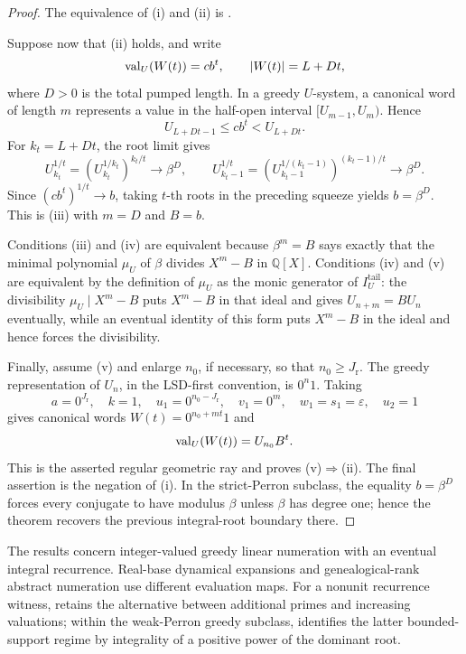 \begin{proof}
  The equivalence of \textup{(i)} and \textup{(ii)} is
  .

  

  Suppose now that \textup{(ii)} holds, and write
  \[
    \operatorname{val}_U(W(t))=cb^t,
    \qquad \lvert W(t) \rvert=L+Dt,
  \]
  where \(D>0\) is the total pumped length.  In a greedy \(U\)-system, a
  canonical word of length \(m\) represents a value in the half-open interval
  \([U_{m-1},U_m)\).  Hence
  \[
    U_{L+Dt-1}\le cb^t<U_{L+Dt}.
  \]
  For \(k_t=L+Dt\), the root limit gives
  \[
    U_{k_t}^{1/t}
      =\left(U_{k_t}^{1/k_t}\right)^{k_t/t}\longrightarrow\beta^D,
    \qquad
    U_{k_t-1}^{1/t}
      =\left(U_{k_t-1}^{1/(k_t-1)}\right)^{(k_t-1)/t}
       \longrightarrow\beta^D.
  \]
  Since \((cb^t)^{1/t}\to b\), taking \(t\)-th roots in the preceding
  squeeze yields \(b=\beta^D\). This is \textup{(iii)} with \(m=D\) and
  \(B=b\).

  Conditions \textup{(iii)} and \textup{(iv)} are equivalent because
  \(\beta^m=B\) says exactly that the minimal polynomial \(\mu_U\) of
  \(\beta\) divides \(X^m-B\) in \(\mathbb Q[X]\). Conditions
  \textup{(iv)} and \textup{(v)} are equivalent by the definition of
  \(\mu_U\) as the monic generator of \(I_U^{\mathrm{tail}}\): the
  divisibility \(\mu_U\mid X^m-B\) puts \(X^m-B\) in that ideal and gives
  \(U_{n+m}=BU_n\) eventually, while an eventual identity of this form
  puts \(X^m-B\) in the ideal and hence forces the divisibility.

  Finally, assume \textup{(v)} and enlarge \(n_0\), if necessary, so that
  \(n_0\ge J_{\mathrm r}\). The greedy representation of \(U_n\), in the
  LSD-first convention, is \(0^n1\). Taking
  \[
    a=0^{J_{\mathrm r}},\quad k=1,\quad
    u_1=0^{n_0-J_{\mathrm r}},\quad v_1=0^m,\quad
    w_1=s_1=\varepsilon,\quad u_2=1
  \]
  gives canonical words \(W(t)=0^{n_0+mt}1\) and
  \[
    \operatorname{val}_U(W(t))=U_{n_0}B^t.
  \]
  This is the asserted regular geometric ray and proves
  \textup{(v)}\(\Rightarrow\)\textup{(ii)}. The final assertion is the
  negation of \textup{(i)}. In the strict-Perron subclass, the equality
  \(b=\beta^D\) forces every conjugate to have modulus \(\beta\) unless
  \(\beta\) has degree one; hence the theorem recovers the previous
  integral-root boundary there.
\end{proof}

\begin{remark}[Scope]
  \label{rem:pisot-open-interfaces}
  The results concern integer-valued greedy linear numeration with an
  eventual integral recurrence. Real-base dynamical expansions and
  genealogical-rank abstract numeration use different evaluation maps. For
  a nonunit recurrence witness, 
  retains the alternative between additional primes and increasing valuations;
  within the weak-Perron greedy subclass,
   identifies the
  latter bounded-support regime by integrality of a positive power of the
  dominant root.
\end{remark}
